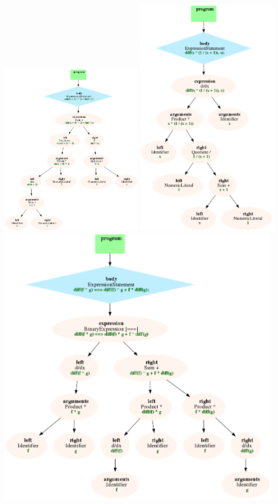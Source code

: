 \includegraphics[width=0.45\textwidth]{../pool/ex-syntax-tree-1-img-c.png}
\includegraphics[width=0.45\textwidth]{../pool/ex-syntax-tree-1-img-d.png}
\\

\includegraphics[width=0.90\textwidth]{../pool/ex-syntax-tree-1-img-e.png}
\\

